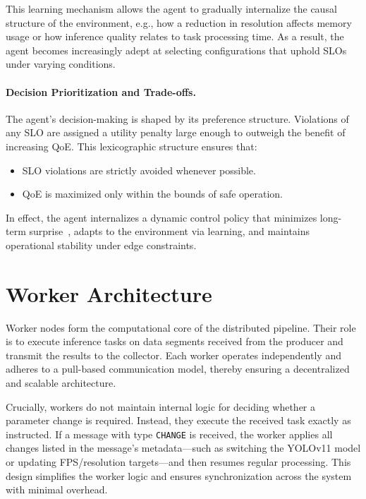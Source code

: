 This learning mechanism allows the agent to gradually internalize the causal structure of the environment, e.g., how a reduction in resolution affects memory usage or how inference quality relates to task processing time. As a result, the agent becomes increasingly adept at selecting configurations that uphold SLOs under varying conditions.

\paragraph{Decision Prioritization and Trade-offs.}
The agent’s decision-making is shaped by its preference structure. Violations of any SLO are assigned a utility penalty large enough to outweigh the benefit of increasing QoE. This lexicographic structure ensures that:
\begin{itemize}
  \item SLO violations are strictly avoided whenever possible.
  \item QoE is maximized only within the bounds of safe operation.
\end{itemize}

In effect, the agent internalizes a dynamic control policy that minimizes long-term surprise~\cite{sedlak_adaptive_2024}, adapts to the environment via learning, and maintains operational stability under edge constraints.


\section{Worker Architecture}
\label{sec:implementation-worker-architecture}
Worker nodes form the computational core of the distributed pipeline. Their role is to execute inference tasks on data segments received from the producer and transmit the results to the collector. Each worker operates independently and adheres to a pull-based communication model, thereby ensuring a decentralized and scalable architecture.

Crucially, workers do not maintain internal logic for deciding whether a parameter change is required. Instead, they execute the received task exactly as instructed. If a message with type \texttt{CHANGE} is received, the worker applies all changes listed in the message's metadata—such as switching the YOLOv11 model or updating FPS/resolution targets—and then resumes regular processing. This design simplifies the worker logic and ensures synchronization across the system with minimal overhead.

